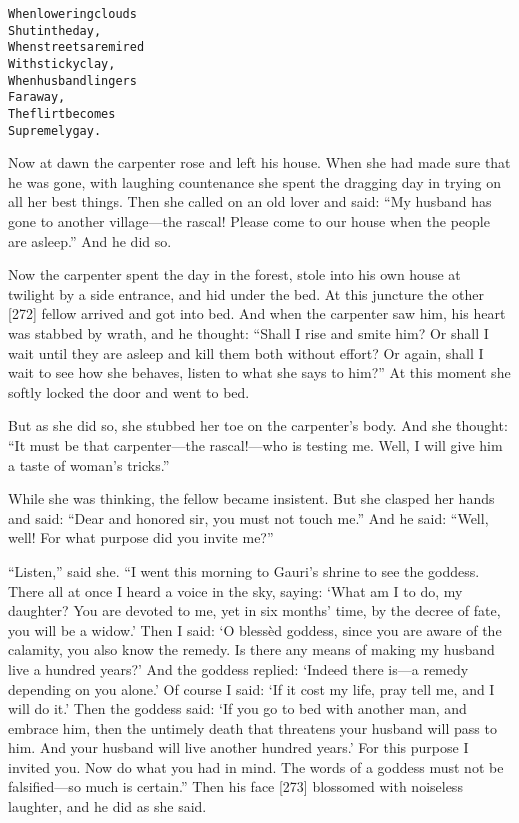 \documentclass{article}
\renewenvironment{verbatim}{\begin{alltt}\normalfont\begin{centering}}{\end{centering}\end{alltt}}
\begin{document}
\begin{verbatim}
When lowering clouds
    Shut in the day,
When streets are mired
    With sticky clay,
When husband lingers
    Far away,
The flirt becomes
    Supremely gay.
\end{verbatim}
Now at dawn the carpenter rose and left his house. When she had
made sure that he was gone, with laughing countenance she spent the
dragging day in trying on all her best things. Then she called on
an old lover and said:
``My husband has gone to another village---the rascal! Please come to our house when the people are asleep.''
And he did so.

Now the carpenter spent the day in the forest, stole into his own
house at twilight by a side entrance, and hid under the bed. At
this juncture the other [272] fellow arrived and got into bed. And
when the carpenter saw him, his heart was stabbed by wrath, and he
thought:
``Shall I rise and smite him? Or shall I wait until they are asleep and kill them both without effort? Or again, shall I wait to see how she behaves, listen to what she says to him?''
At this moment she softly locked the door and went to bed.

But as she did so, she stubbed her toe on the carpenter's body. And
she thought:
``It must be that carpenter---the rascal!---who is testing me. Well, I will give him a taste of woman's tricks.''

While she was thinking, the fellow became insistent. But she
clasped her hands and said:
``Dear and honored sir, you must not touch me.'' And he said:
``Well, well! For what purpose did you invite me?''

``Listen,'' said she.
``I went this morning to Gauri's shrine to see the goddess. There all at once I heard a voice in the sky, saying: `What am I to do, my daughter? You are devoted to me, yet in six months' time, by the decree of fate, you will be a widow.' Then I said: `O blessèd goddess, since you are aware of the calamity, you also know the remedy. Is there any means of making my husband live a hundred years?' And the goddess replied: `Indeed there is---a remedy depending on you alone.' Of course I said: `If it cost my life, pray tell me, and I will do it.' Then the goddess said: `If you go to bed with another man, and embrace him, then the untimely death that threatens your husband will pass to him. And your husband will live another hundred years.' For this purpose I invited you. Now do what you had in mind. The words of a goddess must not be falsified---so much is certain.''
Then his face [273] blossomed with noiseless laughter, and he did
as she said.
\end{document}
